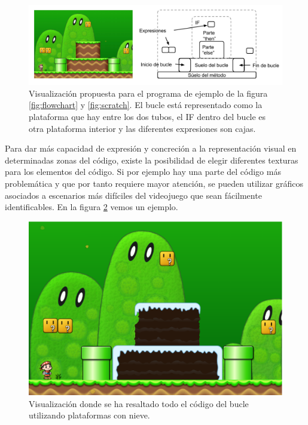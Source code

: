 \documentclass{llncs}
\begin{document}
\begin{figure}[ht]
\begin{center}
\includegraphics[scale=0.4]{images/flowchartgame2.pdf}
\caption{Visualización propuesta para el programa de ejemplo de la figura \ref{fig:flowchart} y \ref{fig:scratch}. El bucle está representado como la plataforma que hay entre los dos tubos, el IF dentro del bucle es otra plataforma interior y las diferentes expresiones son cajas.
\label{fig:flowchartgame}}
\end{center}
\end{figure}

Para dar más capacidad de expresión y concreción a la representación visual en determinadas zonas del código, existe la posibilidad de elegir diferentes texturas para los elementos del código. Si por ejemplo hay una parte del código más problemática y que por tanto requiere mayor atención, se pueden utilizar gráficos asociados a escenarios más difíciles del videojuego que sean fácilmente identificables. En la figura \ref{fig:texture} vemos un ejemplo.

\begin{figure}[ht]
\begin{center}
\includegraphics[scale=0.15]{images/texture.eps}
\caption{Visualización donde se ha resaltado todo el código del bucle utilizando plataformas con nieve.
\label{fig:texture}}
\end{center}
\end{figure}
\end{document}
